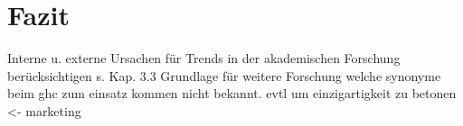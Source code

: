 \section{Fazit}
Interne u. externe Ursachen für Trends in der akademischen Forschung berücksichtigen s. Kap. 3.3
Grundlage für weitere Forschung
welche synonyme beim ghc zum einsatz kommen nicht bekannt. evtl um einzigartigkeit zu betonen <- marketing